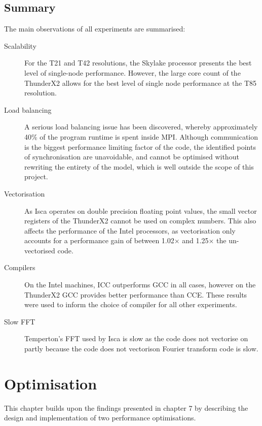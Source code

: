 \documentclass[a4paper,11pt]{report}
\begin{document}
\section{Summary}
The main observations of all experiments are summarised:
\begin{description}

	\item[Scalability] For the T21 and T42 resolutions, the Skylake processor presents the best level of single-node performance. However, the large core count of the ThunderX2 allows for the best level of single node performance at the T85 resolution. 

	\item[Load balancing] A serious load balancing issue has been discovered, whereby approximately 40\% of the program runtime is spent inside MPI. Although communication is the biggest performance limiting factor of the code, the identified points of synchronisation are unavoidable, and cannot be optimised without rewriting the entirety of the model, which is well outside the scope of this project.
	
	\item[Vectorisation] As Isca operates on double precision floating point values, the small vector registers of the ThunderX2 cannot be used on complex numbers. This also affects the performance of the Intel processors, as vectorisation only accounts for a performance gain of between 1.02$\times$ and 1.25$\times$ the un-vectorised code. 
	
	\item[Compilers] On the Intel machines, ICC outperforms GCC in all cases, however on the ThunderX2 GCC provides better performance than CCE. These results were used to inform the choice of compiler for all other experiments. 
	
	\item[Slow FFT] Temperton's FFT used by Isca is slow as the code does not vectorise on  partly because the code does not vectorison  Fourier transform code is slow. 
	
\end{description}






\let\textcircled=\pgftextcircled
\chapter[Optimisation]{Optimisation}
\label{chap:optimiations}
This chapter builds upon the findings presented in chapter 7 by describing the design and implementation of two performance optimisations. 
\end{document}
